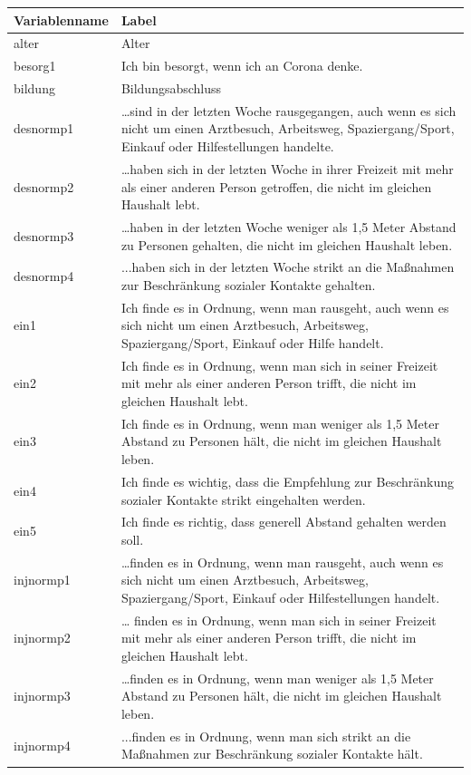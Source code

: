 \documentclass[
]{book}
\begin{document}
\begin{tabular}{l|l}
\hline
Variablenname & Label\\
\hline
alter & Alter\\
\hline
besorg1 & Ich bin besorgt, wenn ich an Corona denke.\\
\hline
bildung & Bildungsabschluss\\
\hline
desnormp1 & …sind in der letzten Woche rausgegangen, auch wenn es sich nicht um einen Arztbesuch, Arbeitsweg, Spaziergang/Sport, Einkauf oder Hilfestellungen handelte.\\
\hline
desnormp2 & …haben sich in der letzten Woche in ihrer Freizeit mit mehr als einer anderen Person getroffen, die nicht im gleichen Haushalt lebt.\\
\hline
desnormp3 & …haben in der letzten Woche weniger als 1,5 Meter Abstand zu Personen gehalten, die nicht im gleichen Haushalt leben.\\
\hline
desnormp4 & ...haben sich in der letzten Woche strikt an die Maßnahmen zur Beschränkung sozialer Kontakte gehalten.\\
\hline
ein1 & Ich finde es in Ordnung, wenn man rausgeht, auch wenn es sich nicht um einen Arztbesuch, Arbeitsweg, Spaziergang/Sport, Einkauf oder Hilfe handelt.\\
\hline
ein2 & Ich finde es in Ordnung, wenn man sich in seiner Freizeit mit mehr als einer anderen Person trifft, die nicht im gleichen Haushalt lebt.\\
\hline
ein3 & Ich finde es in Ordnung, wenn man weniger als 1,5 Meter Abstand zu Personen hält, die nicht im gleichen Haushalt leben.\\
\hline
ein4 & Ich finde es wichtig, dass die Empfehlung zur Beschränkung sozialer Kontakte strikt eingehalten werden.\\
\hline
ein5 & Ich finde es richtig, dass generell Abstand gehalten werden soll.\\
\hline
injnormp1 & …finden es in Ordnung, wenn man rausgeht, auch wenn es sich nicht um einen Arztbesuch, Arbeitsweg, Spaziergang/Sport, Einkauf oder Hilfestellungen handelt.\\
\hline
injnormp2 & … finden es in Ordnung, wenn man sich in seiner Freizeit mit mehr als einer anderen Person trifft, die nicht im gleichen Haushalt lebt.\\
\hline
injnormp3 & …finden es in Ordnung, wenn man weniger als 1,5 Meter Abstand zu Personen hält, die nicht im gleichen Haushalt leben.\\
\hline
injnormp4 & ...finden es in Ordnung, wenn man sich strikt an die Maßnahmen zur Beschränkung sozialer Kontakte hält.\\

\end{tabular}
\end{document}
